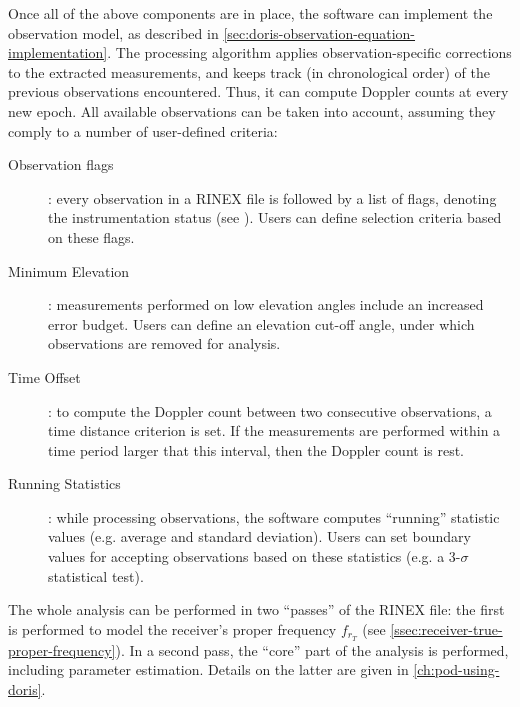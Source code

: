 Once all of the above components are in place, the software can implement the 
observation model, as described in \autoref{sec:doris-observation-equation-implementation}.
The processing algorithm applies observation-specific corrections to the extracted 
measurements, and keeps track (in chronological order) of the previous observations 
encountered. Thus, it can compute Doppler counts at every new epoch. All available 
observations can be taken into account, assuming they comply to a number of user-defined 
criteria:
\begin{description}
  \item[Observation flags]: every observation in a RINEX file is followed by 
    a list of flags, denoting the instrumentation status (see \cite{DORISRNX3}). Users 
    can define selection criteria based on these flags.
  \item[Minimum Elevation]: measurements performed on low 
    elevation angles include an increased error budget. Users can define an 
    elevation cut-off angle, under which observations are removed for analysis.
  \item[Time Offset]: to compute the Doppler count between two consecutive observations, 
    a time distance criterion is set. If the measurements are performed within a  
    time period larger that this interval, then the Doppler count is rest.
  \item[Running Statistics]: while processing observations, the software computes 
    ``running'' statistic values (e.g. average and standard deviation). Users can 
    set boundary values for accepting observations based on these statistics (e.g. 
    a 3-$\sigma$ statistical test).
\end{description}

The whole analysis can be performed in two ``passes'' of the RINEX file: the first is 
performed to model the receiver's proper frequency $f_{r_T}$ (see 
\autoref{ssec:receiver-true-proper-frequency}). 
In a second pass, the ``core'' part of the analysis is performed, including 
parameter estimation. Details on the latter are given in \autoref{ch:pod-using-doris}.
